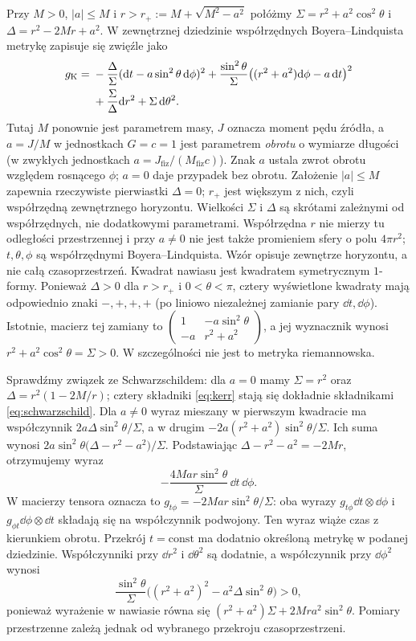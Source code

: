 \begin{przyklad}[Kerr]
\label{prz:metryka-kerr}
Przy $M>0$, $|a|\leq M$ i
$r>r_+:=M+\sqrt{M^2-a^2}$ połóżmy
$\Sigma=r^2+a^2\cos^2\theta$ i
$\Delta=r^2-2Mr+a^2$. W zewnętrznej
dziedzinie współrzędnych Boyera--Lindquista
metrykę zapisuje się zwięźle jako
\begin{align}\label{eq:kerr}
 g_{\mathrm K}
 ={}&-\frac{\Delta}{\Sigma}
       (\mathrm d t-a\sin^2\theta\,\mathrm d\phi)^2
  +\frac{\sin^2\theta}{\Sigma}
       \bigl((r^2+a^2)\mathrm d\phi-a\,\mathrm d t\bigr)^2\\
 &+\frac{\Sigma}{\Delta}\mathrm d r^2
  +\Sigma\,\mathrm d\theta^2.\notag
\end{align}
Tutaj $M$ ponownie jest parametrem masy,
$J$ oznacza moment pędu źródła, a
$a=J/M$ w jednostkach $G=c=1$ jest parametrem
\emph{obrotu} o wymiarze długości
(w zwykłych jednostkach $a=J_{\mathrm{fiz}}/
(M_{\mathrm{fiz}}c)$). Znak $a$ ustala zwrot
obrotu względem rosnącego $\phi$; $a=0$ daje
przypadek bez obrotu. Założenie $|a|\leq M$
zapewnia rzeczywiste pierwiastki $\Delta=0$;
$r_+$ jest większym z nich, czyli współrzędną
zewnętrznego horyzontu. Wielkości $\Sigma$ i
$\Delta$ są skrótami zależnymi od współrzędnych,
nie dodatkowymi parametrami. Współrzędna $r$
nie mierzy tu odległości przestrzennej i przy
$a\ne0$ nie jest także promieniem sfery o polu
$4\pi r^2$; $t,\theta,\phi$ są współrzędnymi
Boyera--Lindquista. Wzór opisuje zewnętrze
horyzontu, a nie całą czasoprzestrzeń.
Kwadrat nawiasu jest kwadratem symetrycznym
$1$-formy. Ponieważ $\Delta>0$ dla $r>r_+$
i $0<\theta<\pi$, cztery wyświetlone
kwadraty mają odpowiednio znaki $-,+,+,+$
(po liniowo niezależnej zamianie pary
$\dd t,\dd\phi$). Istotnie, macierz tej zamiany to
$\left(\begin{smallmatrix}1&-a\sin^2\theta\\-a&r^2+a^2\end{smallmatrix}\right)$,
a jej wyznacznik wynosi $r^2+a^2\cos^2\theta=\Sigma>0$. W szczególności nie jest
to metryka riemannowska.

Sprawdźmy związek ze Schwarzschildem:
dla $a=0$ mamy $\Sigma=r^2$ oraz
$\Delta=r^2(1-2M/r)$; cztery składniki
\eqref{eq:kerr} stają się dokładnie
składnikami \eqref{eq:schwarzschild}.
Dla $a\ne0$ wyraz mieszany w pierwszym kwadracie ma
współczynnik $2a\Delta\sin^2\theta/\Sigma$, a w drugim
$-2a(r^2+a^2)\sin^2\theta/\Sigma$.
Ich suma wynosi
$2a\sin^2\theta\bigl(\Delta-r^2-a^2\bigr)/\Sigma$.
Podstawiając $\Delta-r^2-a^2=-2Mr$, otrzymujemy wyraz
\[
 -\frac{4Mar\sin^2\theta}{\Sigma}
      \,\dd t\,\dd\phi.
\]
W macierzy tensora oznacza to
$g_{t\phi}=-2Mar\sin^2\theta/\Sigma$:
oba wyrazy $g_{t\phi}\dd t\otimes\dd\phi$
i $g_{\phi t}\dd\phi\otimes\dd t$ składają
się na współczynnik podwojony.
Ten wyraz wiąże czas z kierunkiem obrotu.
Przekrój $t=\mathrm{const}$ ma dodatnio określoną
metrykę w podanej dziedzinie. Współczynniki przy
$\dd r^2$ i $\dd\theta^2$ są dodatnie, a współczynnik
przy $\dd\phi^2$ wynosi
\[
 \frac{\sin^2\theta}{\Sigma}
 \bigl((r^2+a^2)^2-a^2\Delta\sin^2\theta\bigr)>0,
\]
ponieważ wyrażenie w nawiasie równa się
$(r^2+a^2)\Sigma+2Mr a^2\sin^2\theta$.
Pomiary przestrzenne zależą jednak od wybranego
przekroju czasoprzestrzeni.
\end{przyklad}

